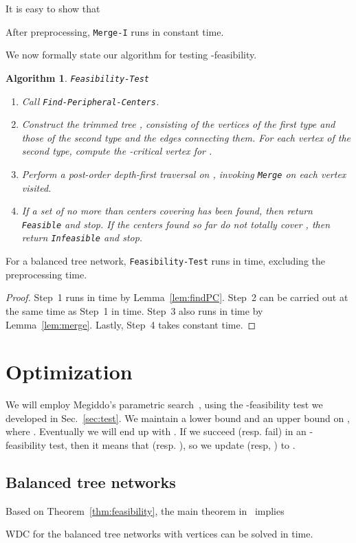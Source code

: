 \documentclass{llncs}
\newtheorem{algorithm}{Algorithm}
\newcommand{\QED}{\hfill}
\begin{document}
{It is easy to show that
\begin{lemma}\label{lem:merge}
After preprocessing,
{\tt Merge-I} runs in constant time.
\QED
\end{lemma}

We now formally state our algorithm for testing -feasibility.
\begin{algorithm}{\tt Feasibility-Test}\label{alg:feasibility}
\begin{enumerate}
\item
Call {\tt Find-Peripheral-Centers}.
\item
Construct the trimmed tree , 
consisting of the vertices of the first type and those of the second type
and the edges connecting them.
For each vertex  of the second type,
compute the -critical vertex for .
\item
Perform a post-order depth-first traversal on ,
invoking {\tt Merge} on each vertex  visited.
\item
If a set of no more than  centers covering  has been found,
then return {\tt Feasible} and stop.
If the  centers found so far do not totally cover ,
then return {\tt Infeasible} and stop.
\QED
\end{enumerate}
\end{algorithm}

\begin{theorem}\label{thm:feasibility}
For a balanced tree network, 
{\tt Feasibility-Test} runs in  time,
excluding the preprocessing time.
\end{theorem}
\begin{proof}
Step~1 runs in  time by Lemma~\ref{lem:findPC}.
Step~2 can be carried out at the same time as Step~1 in  time.
Step~3 also runs in  time  by Lemma~\ref{lem:merge}.
Lastly, Step~4 takes constant time.
\QED
\end{proof}


\section{Optimization}\label{sec:optimal}
We will employ Megiddo's parametric search~\cite{megiddo1979},
using the -feasibility test we developed in Sec.~\ref{sec:test}.
We maintain a lower bound  and an upper bound  on ,
where .
Eventually we will end up with .
If we succeed (resp. fail) in an -feasibility test, then it means that 
(resp. ), so we update  (resp, )
to .

\subsection{Balanced tree networks}\label{sec:practical}
Based on Theorem~\ref{thm:feasibility},
the main theorem in~\cite{megiddo1979} implies
\begin{theorem}\label{thm:practical}
WDC for the balanced tree networks with  vertices can be solved in 
 time.
\QED
\end{theorem}

}
\end{document}
